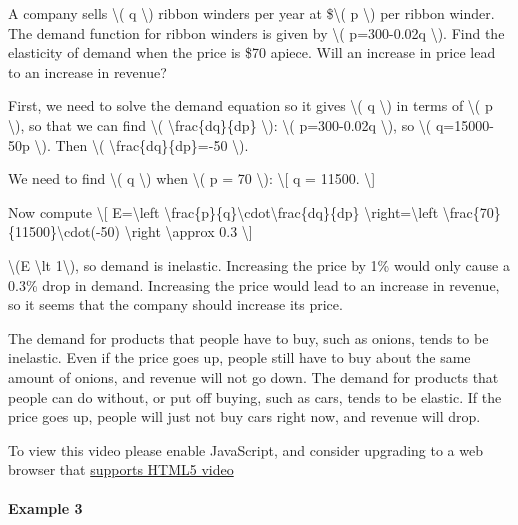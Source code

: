 A company sells \textbackslash{}( q \textbackslash{}) ribbon winders per
year at \$\textbackslash{}( p \textbackslash{}) per ribbon winder. The
demand function for ribbon winders is given by \textbackslash{}(
p=300-0.02q \textbackslash{}). Find the elasticity of demand when the
price is \$70 apiece. Will an increase in price lead to an increase in
revenue?

First, we need to solve the demand equation so it gives
\textbackslash{}( q \textbackslash{}) in terms of \textbackslash{}( p
\textbackslash{}), so that we can find \textbackslash{}(
\textbackslash{}frac\{dq\}\{dp\} \textbackslash{}): \textbackslash{}(
p=300-0.02q \textbackslash{}), so \textbackslash{}( q=15000-50p
\textbackslash{}). Then \textbackslash{}(
\textbackslash{}frac\{dq\}\{dp\}=-50 \textbackslash{}).

We need to find \textbackslash{}( q \textbackslash{}) when
\textbackslash{}( p = 70 \textbackslash{}): \textbackslash{}{[} q =
11500. \textbackslash{}{]}

Now compute \textbackslash{}{[} E=\textbackslash{}left\textbar{}
\textbackslash{}frac\{p\}\{q\}\textbackslash{}cdot\textbackslash{}frac\{dq\}\{dp\}
\textbackslash{}right\textbar{}=\textbackslash{}left\textbar{}
\textbackslash{}frac\{70\}\{11500\}\textbackslash{}cdot(-50)
\textbackslash{}right\textbar{} \textbackslash{}approx 0.3
\textbackslash{}{]}

\textbackslash{}(E \textbackslash{}lt 1\textbackslash{}), so demand is
inelastic. Increasing the price by 1\% would only cause a 0.3\% drop in
demand. Increasing the price would lead to an increase in revenue, so it
seems that the company should increase its price.

The demand for products that people have to buy, such as onions, tends
to be inelastic. Even if the price goes up, people still have to buy
about the same amount of onions, and revenue will not go down. The
demand for products that people can do without, or put off buying, such
as cars, tends to be elastic. If the price goes up, people will just not
buy cars right now, and revenue will drop.

To view this video please enable JavaScript, and consider upgrading to a
web browser that \href{http://videojs.com/html5-video-support/}{supports
HTML5 video}

\hypertarget{example-3}{%
\paragraph{Example 3}\label{example-3}}

